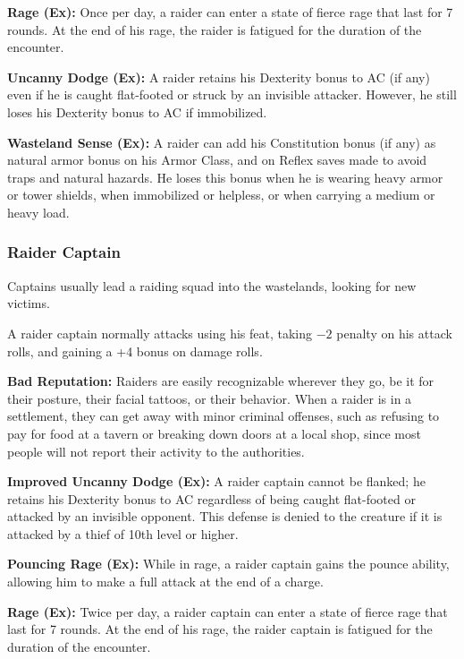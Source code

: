 \textbf{Rage (Ex):} Once per day, a raider can enter a state of fierce rage that last for 7 rounds. At the end of his rage, the raider is fatigued for the duration of the encounter.

\textbf{Uncanny Dodge (Ex):} A raider retains his Dexterity bonus to AC (if any) even if he is caught flat-footed or struck by an invisible attacker. However, he still loses his Dexterity bonus to AC if immobilized.

\textbf{Wasteland Sense (Ex):} A raider can add his Constitution bonus (if any) as natural armor bonus on his Armor Class, and on Reflex saves made to avoid traps and natural hazards. He loses this bonus when he is wearing heavy armor or tower shields, when immobilized or helpless, or when carrying a medium or heavy load.


\subsubsection{Raider Captain}

Captains usually lead a raiding squad into the wastelands, looking for new victims.

A raider captain normally attacks using his  feat, taking $-2$ penalty on his attack rolls, and gaining a +4 bonus on damage rolls.

\textbf{Bad Reputation:} Raiders are easily recognizable wherever they go, be it for their posture, their facial tattoos, or their behavior. When a raider is in a settlement, they can get away with minor criminal offenses, such as refusing to pay for food at a tavern or breaking down doors at a local shop, since most people will not report their activity to the authorities.

\textbf{Improved Uncanny Dodge (Ex):} A raider captain cannot be flanked; he retains his Dexterity bonus to AC regardless of being caught flat-footed or attacked by an invisible opponent. This defense is denied to the creature if it is attacked by a thief of 10th level or higher.

\textbf{Pouncing Rage (Ex):} While in rage, a raider captain gains the pounce ability, allowing him to make a full attack at the end of a charge.

\textbf{Rage (Ex):} Twice per day, a raider captain can enter a state of fierce rage that last for 7 rounds. At the end of his rage, the raider captain is fatigued for the duration of the encounter.

